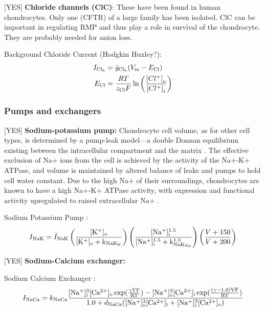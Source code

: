[YES] {\bf Chloride channels (ClC)}: These have been found in human
chondrocytes. Only one (CFTR) of a large family has been isolated. ClC
can be important in regulating RMP and thus play a role in survival of
the chondrocyte. They are probably needed for anion loss.

Background Chloride Current (Hodgkin Huxley?):
\begin{equation}
  \begin{split}
    I_{\rm Cl_b} & = \bar{g}_{\rm Cl_b} (V_{\rm m} - E_{\rm Cl})\\
    E_{\rm Cl} & =  \frac{R T}{z_{\rm Cl} F}
    \ln\left(\frac{\left[Cl^{+}\right]_{o}}
      {\left[Cl^{+}\right]_{i}}\right)
  \end{split}
\end{equation}

\subsubsection*{Pumps and exchangers}
\label{sec:pumps-and-exchangers}

[YES] {\bf Sodium-potassium pump:} Chondrocyte cell volume, as for
other cell types, is determined by a pump-leak model---a double Donnan
equilibrium existing between the intracellular compartment and the
matrix \citep{Stockwell1991}. The effective exclusion of Na+ ions from
the cell is achieved by the activity of the Na+-K+ ATPase, and volume
is maintained by altered balance of leaks and pumps to hold cell water
constant. Due to the high Na+ of their surroundings, chondrocytes are
known to have a high Na+-K+ ATPase activity, with expression and
functional activity upregulated to raised extracellular Na+
\citep{Mobasherietal1997}.

Sodium Potassium Pump \citep[Table 12, pp. 77]{Nygrenetal1998}:
\begin{equation}
  I_{\rm NaK} =
  \bar{I}_{\rm NaK} \left( \frac{[\rm K^{+}]_{\rm o}}{[\rm K^{+}]_{\rm o} +
    k_{\rm NaK_{K}}} \right) \left(\frac{[\rm Na^{+}]^{1.5}_{\rm i}}{[\rm
    Na^{+}]^{1.5}_{\rm i} + k^{1.5}_{\rm NaK_{Na}}}\right) \left( \frac{V + 150}{V +
    200} \right)
\end{equation}

[YES] {\bf Sodium-Calcium exchanger:}

Sodium Calcium Exchanger \citep[Table 13, pp. 77]{Nygrenetal1998}:
\begin{equation}
  I_{\rm NaCa} = k_{\rm NaCa} \frac{[\rm Na^{+}]^{3}_{i}[\rm
    Ca^{2+}]_{o} \exp(\frac{\gamma V F}{R T}) - [\rm
    Na^{+}]^{3}_{o}[\rm Ca^{2+}]_{i} \exp(\frac{(\gamma - 1.0) V F}{R
      T})} {1.0 + d_{\rm NaCa}([\rm Na^{+}]^{3}_{o}[\rm Ca^{2+}]_{i} +
    [\rm Na^{+}]^{3}_{i}[\rm Ca^{2+}]_{o})}
\end{equation}

